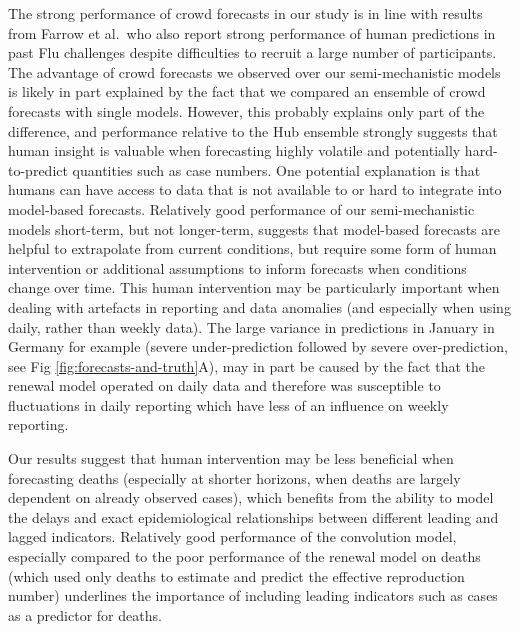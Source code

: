 \documentclass[10pt,letterpaper]{article}
\begin{document}
The strong performance of crowd forecasts in our study is in line with
results from Farrow et al.~who also report strong performance of human
predictions in past Flu challenges despite difficulties to recruit a
large number of participants. The advantage of crowd forecasts we
observed over our semi-mechanistic models is likely in part explained by
the fact that we compared an ensemble of crowd forecasts with single
models. However, this probably explains only part of the difference, and
performance relative to the Hub ensemble strongly suggests that human
insight is valuable when forecasting highly volatile and potentially
hard-to-predict quantities such as case numbers. One potential
explanation is that humans can have access to data that is not available
to or hard to integrate into model-based forecasts. Relatively good
performance of our semi-mechanistic models short-term, but not
longer-term, suggests that model-based forecasts are helpful to
extrapolate from current conditions, but require some form of human
intervention or additional assumptions to inform forecasts when
conditions change over time. This human intervention may be particularly
important when dealing with artefacts in reporting and data anomalies
(and especially when using daily, rather than weekly data). The large
variance in predictions in January in Germany for example (severe
under-prediction followed by severe over-prediction, see Fig
\ref{fig:forecasts-and-truth}A), may in part be caused by the fact that
the renewal model operated on daily data and therefore was susceptible
to fluctuations in daily reporting which have less of an influence on
weekly reporting.

Our results suggest that human intervention may be less beneficial when
forecasting deaths (especially at shorter horizons, when deaths are
largely dependent on already observed cases), which benefits from the
ability to model the delays and exact epidemiological relationships
between different leading and lagged indicators. Relatively good
performance of the convolution model, especially compared to the poor
performance of the renewal model on deaths (which used only deaths to
estimate and predict the effective reproduction number) underlines the
importance of including leading indicators such as cases as a predictor
for deaths.
\end{document}
